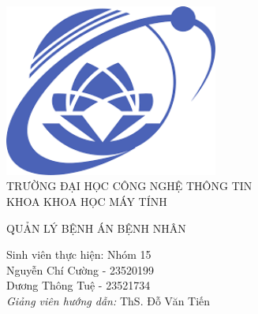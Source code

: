 \documentclass[12pt]{report}
\begin{document}
    
\begin{titlepage}      
    \begin{center}
        \includegraphics[width=7cm]{figures/uit.png}\\[2cm]
        {\LARGE TRƯỜNG ĐẠI HỌC CÔNG NGHỆ THÔNG TIN\\[0.5cm]
        KHOA KHOA HỌC MÁY TÍNH}\\

        \vfill

        \linespread{1.2}\huge {
            QUẢN LÝ BỆNH ÁN BỆNH NHÂN 
        }

        \vfill

        {\large
            Sinh viên thực hiện: Nhóm 15
        }\\[0.5cm]

        {\Large 
            Nguyễn Chí Cường - 23520199 \\
            Dương Thông Tuệ - 23521734
        }\\[0.5cm] 
        

        {\large 
            \emph{Giảng viên hướng dẫn:} ThS. Đỗ Văn Tiến}\\[1cm] %
        
                
    \end{center}
\end{titlepage}

\newpage
\tableofcontents




\end{document}
